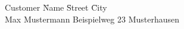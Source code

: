 
\begin{tabbing}
Customer \= Name \hspace*{1.5cm} \= Street \hspace*{1.5cm} \= City \\
\> Max Mustermann \> Beispielweg 23 \> Musterhausen \\
\end{tabbing}


